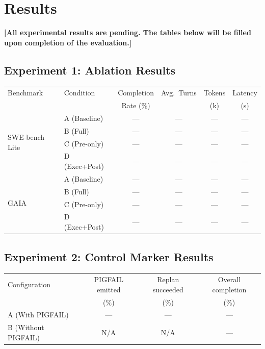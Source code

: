 \section{Results}
\label{sec:results}

\textbf{[All experimental results are pending. The tables below will be filled upon completion of the evaluation.]}

\subsection{Experiment 1: Ablation Results}

\begin{center}
\begin{tabular}{llcccc}
\toprule
Benchmark & Condition & Completion & Avg.\ Turns & Tokens & Latency \\
 & & Rate (\%) & & (k) & (s) \\
\midrule
\multirow{4}{*}{SWE-bench Lite} & A (Baseline) & --- & --- & --- & --- \\
 & B (Full) & --- & --- & --- & --- \\
 & C (Pre-only) & --- & --- & --- & --- \\
 & D (Exec+Post) & --- & --- & --- & --- \\
\midrule
\multirow{4}{*}{GAIA} & A (Baseline) & --- & --- & --- & --- \\
 & B (Full) & --- & --- & --- & --- \\
 & C (Pre-only) & --- & --- & --- & --- \\
 & D (Exec+Post) & --- & --- & --- & --- \\
\bottomrule
\end{tabular}
\end{center}

\subsection{Experiment 2: Control Marker Results}

\begin{center}
\begin{tabular}{lccc}
\toprule
Configuration & PIGFAIL emitted & Replan succeeded & Overall completion \\
 & (\%) & (\%) & (\%) \\
\midrule
A (With PIGFAIL) & --- & --- & --- \\
B (Without PIGFAIL) & N/A & N/A & --- \\
\bottomrule
\end{tabular}
\end{center}

